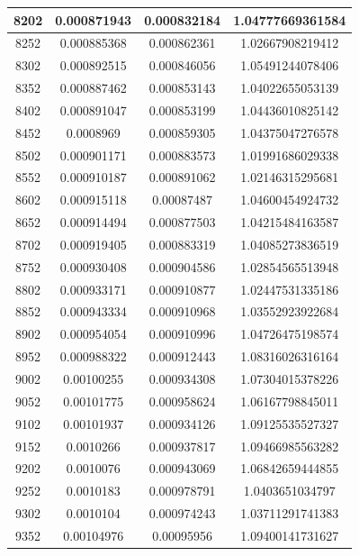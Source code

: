\documentclass{article}
\begin{document}
\begin{longtable}{|c|c|c|c|}
		8202	&   0.000871943	  & 0.000832184	 &  1.04777669361584   \\ \hline
		8252	&   0.000885368	  & 0.000862361	 &  1.02667908219412   \\ \hline
		8302	&   0.000892515	  & 0.000846056	 &  1.05491244078406   \\ \hline
		8352	&   0.000887462	  & 0.000853143	 &  1.04022655053139   \\ \hline
		8402	&   0.000891047	  & 0.000853199	 &  1.04436010825142   \\ \hline
		8452	&   0.0008969	  & 0.000859305	 &  1.04375047276578   \\ \hline
		8502	&   0.000901171	  & 0.000883573	 &  1.01991686029338   \\ \hline
		8552	&   0.000910187	  & 0.000891062	 &  1.02146315295681   \\ \hline
		8602	&   0.000915118	  & 0.00087487	 &  1.04600454924732   \\ \hline
		8652	&   0.000914494	  & 0.000877503	 &  1.04215484163587   \\ \hline
		8702	&   0.000919405	  & 0.000883319	 &  1.04085273836519   \\ \hline
		8752	&   0.000930408	  & 0.000904586	 &  1.02854565513948   \\ \hline
		8802	&   0.000933171	  & 0.000910877	 &  1.02447531335186   \\ \hline
		8852	&   0.000943334	  & 0.000910968	 &  1.03552923922684   \\ \hline
		8902	&   0.000954054	  & 0.000910996	 &  1.04726475198574   \\ \hline
		8952	&   0.000988322	  & 0.000912443	 &  1.08316026316164   \\ \hline
		9002	&   0.00100255	  & 0.000934308	 &  1.07304015378226   \\ \hline
		9052	&   0.00101775	  & 0.000958624	 &  1.06167798845011   \\ \hline
		9102	&   0.00101937	  & 0.000934126	 &  1.09125535527327   \\ \hline
		9152	&   0.0010266	  & 0.000937817	 &  1.09466985563282   \\ \hline
		9202	&   0.0010076	  & 0.000943069	 &  1.06842659444855   \\ \hline
		9252	&   0.0010183	  & 0.000978791	 &  1.0403651034797   \\ \hline
		9302	&   0.0010104	  & 0.000974243	 &  1.03711291741383   \\ \hline
		9352	&   0.00104976	  & 0.00095956	 &  1.09400141731627   \\ \hline

\end{longtable}
\end{document}
